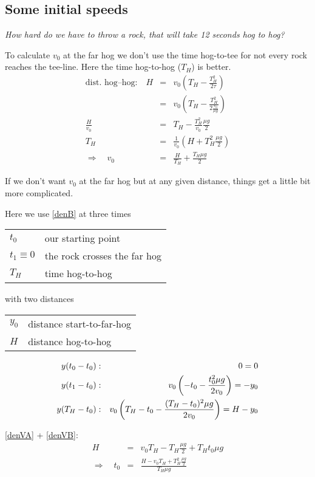 \subsection{Some initial speeds}

\textit{How hard do we have to throw a rock, that will take 12 seconds hog to
hog?}

To calculate $v_0$ at the far hog we don't use the time hog-to-tee for not
every rock reaches the tee-line. Here the time hog-to-hog ($T_H$) is better.
\begin{eqnarray}
\mbox{dist.~hog--hog:} \quad H &=& v_0 \left( T_H - \frac{T_H^2}{2\tau}\right) \\
&=& v_0 \left(T_H - \frac{T_H^2}{2 \frac{v_0}{\mu g} }\right) \\
\frac{H}{v_0} &=& T_H - \frac{T_H^2}{v_0} \frac{\mu g}{2} \\
T_H &=& \frac{1}{v_0} \left(H + T_H^2 \frac{\mu g}{2}\right) \\
\Longrightarrow\quad
v_0 &=& \frac{H}{T_H} + \frac{T_H\mu g}{2}
\end{eqnarray}

If we don't want $v_0$ at the far hog but at any given distance, things get a
little bit more complicated.

Here we use \eqref{denB} at three times

\medskip
\begin{tabular}{l@{ : }l}
$t_0          $ & our starting point \\
$t_1 \equiv 0 $ & the rock crosses the far hog \\
$T_H $          & time hog-to-hog
\end{tabular}
\medskip

\noindent
with two distances

\medskip
\begin{tabular}{l@{ : }l}
$y_0$ & distance start-to-far-hog \\
$H  $ & distance hog-to-hog
\end{tabular}
\medskip

\begin{eqnarray}
y(t_0 - t_0) &:& 0 = 0 \\
\eqlab{denVA}
y(t_1 - t_0) &:& v_0 \left(-t_0 - \frac{t_0^2 \mu g}{2 v_0}\right) = -y_0 \\
\eqlab{denVB}
y(T_H - t_0) &:& v_0 \left(T_H-t_0 - \frac{(T_H-t_0)^2\mu g}{2v_0}\right) = H-y_0 
\end{eqnarray}

\eqref{denVA} + \eqref{denVB}:
\begin{eqnarray}
H &=& v_0 T_H - T_H\frac{\mu g}{2} + T_H t_0 \mu g \\
\Longrightarrow\quad
t_0 &=& \frac{H - v_0 T_H + T_H^2\frac{\mu g}{2}}{ T_H \mu g }
\end{eqnarray}

